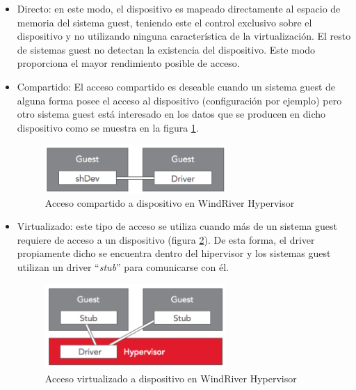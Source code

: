 \begin{itemize}
  \item Directo: en este modo, el dispositivo es mapeado directamente al espacio de memoria del sistema guest, teniendo este el control exclusivo sobre el dispositivo y no utilizando ninguna característica de la virtualización. El resto de sistemas guest no detectan la existencia del dispositivo. Este modo proporciona el mayor rendimiento posible de acceso.

  \item Compartido: El acceso compartido es deseable cuando un sistema guest de alguna forma posee el acceso al dispositivo (configuración por ejemplo) pero otro sistema guest está interesado en los datos que se producen en dicho dispositivo como se muestra en la figura \ref{fig:windriver_drv_1}.
  \begin{figure}[!htb]
  	\centering
  	\includegraphics[width=0.65\textwidth]{recursos/windriver_drv_1.png}
  	\caption{Acceso compartido a dispositivo en WindRiver Hypervisor}
  	\label{fig:windriver_drv_1}
  \end{figure}

  \item Virtualizado: este tipo de acceso se utiliza cuando más de un sistema guest requiere de acceso a un dispositivo (figura \ref{fig:windriver_drv_2}). De esta forma, el driver propiamente dicho se encuentra dentro del hipervisor y los sistemas guest utilizan un driver ``\textit{stub}'' para comunicarse con él.\\[2cm]
  \begin{figure}[!h]
  	\centering
  	\includegraphics[width=0.65\textwidth]{recursos/windriver_drv_2.png}
  	\caption{Acceso virtualizado a dispositivo en WindRiver Hypervisor}
  	\label{fig:windriver_drv_2}
  \end{figure}


\end{itemize}
